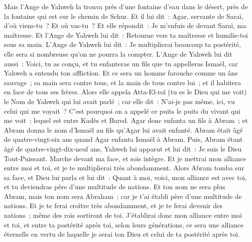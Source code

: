 \begin{multicols}{2}
Mais l'Ange de Yahweh la trouva près d'une fontaine d'eau dans le désert, près de la fontaine qui est sur le chemin de Schur.
Et il lui dit~: Agar, servante de Saraï, d'où viens-tu~? Et où vas-tu~? Et elle répondit~: Je m'enfuis de devant Saraï, ma maîtresse.
Et l'Ange de Yahweh lui dit~: Retourne vers ta maîtresse et humilie-toi sous sa main.
L'Ange de Yahweh lui dit~: Je multiplierai beaucoup ta postérité, elle sera si nombreuse qu'on ne pourra la compter.
L'Ange de Yahweh lui dit aussi~: Voici, tu as conçu, et tu enfanteras un fils que tu appelleras Ismaël, car Yahweh a entendu ton affliction.
Et ce sera un homme farouche comme un âne sauvage~; sa main sera contre tous, et la main de tous contre lui~; et il habitera en face de tous ses frères.
Alors elle appela Atta-El-roï (tu es le Dieu qui me voit) le Nom de Yahweh qui lui avait parlé~; car elle dit~: N'ai-je pas même, ici, vu celui qui me voyait~?
C'est pourquoi on a appelé ce puits le puits du vivant qui me voit~; lequel est entre Kadès et Bared.
Agar donc enfanta un fils à Abram~; et Abram donna le nom d'Ismaël au fils qu'Agar lui avait enfanté.
Abram était âgé de quatre-vingt-six ans quand Agar enfanta Ismaël à Abram.
\VerseOne{}Puis, Abram étant âgé de quatre-vingt-dix-neuf ans, Yahweh lui apparut et lui dit~: Je suis le Dieu Tout-Puissant. Marche devant ma face, et sois intègre.
Et je mettrai mon alliance entre moi et toi, et je te multiplierai très abondamment.
Alors Abram tomba sur sa face, et Dieu lui parla et lui dit~:
Quant à moi, voici, mon alliance est avec toi, et tu deviendras père d'une multitude de nations.
Et ton nom ne sera plus Abram, mais ton nom sera Abraham~; car je t'ai établi père d'une multitude de nations.
Et je te ferai croître très abondamment, et je te ferai devenir des nations~; même des rois sortiront de toi.
J'établirai donc mon alliance entre moi et toi, et entre ta postérité après toi, selon leurs générations, ce sera une alliance éternelle en vertu de laquelle je serai ton Dieu et celui de ta postérité après toi.

\end{multicols}
